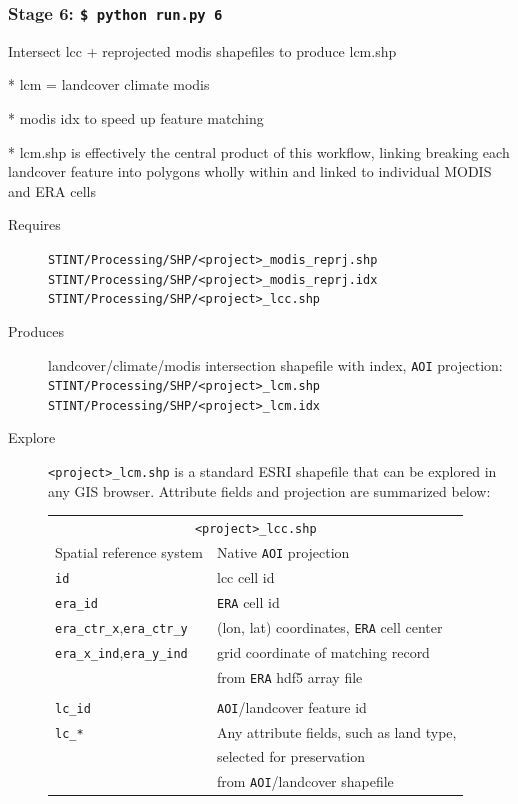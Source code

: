 \documentclass[twoside,a4paper]{refart}
\begin{document}
\subsubsection{\textbf{Stage 6:} \texttt{\$ python run.py 6}}
        Intersect lcc + reprojected modis shapefiles to produce lcm.shp
        
        * lcm = landcover climate modis
        
        * modis idx to speed up feature matching
        
        * lcm.shp is effectively the central product of this workflow, linking
          breaking each landcover feature into polygons wholly within and
          linked to individual MODIS and ERA cells

  \begin{description}
    \item [Requires]
      \texttt{STINT/Processing/SHP/<project>\_modis\_reprj.shp} \\
      \texttt{STINT/Processing/SHP/<project>\_modis\_reprj.idx} \\
      \texttt{STINT/Processing/SHP/<project>\_lcc.shp}
  
  
    \item [Produces]
      landcover/climate/modis intersection shapefile with index, 
      \texttt{AOI} projection:\\
      \texttt{STINT/Processing/SHP/<project>\_lcm.shp}\\
      \texttt{STINT/Processing/SHP/<project>\_lcm.idx}
      

    \item [Explore]
      \texttt{<project>\_lcm.shp} is a standard ESRI shapefile that can be explored in any GIS browser.  Attribute fields and projection are summarized below:
      
\begin{tabular}{ll}
       \multicolumn{2}{c}{\texttt{<project>\_lcc.shp}} \\
Spatial reference system        & Native \texttt{AOI} projection \\
\texttt{id}                     & lcc cell id \\  
\texttt{era\_id}                & \texttt{ERA} cell id \\  
\texttt{era\_ctr\_x},\texttt{era\_ctr\_y} & (lon, lat) coordinates, \texttt{ERA} cell center \\
\texttt{era\_x\_ind},\texttt{era\_y\_ind} & grid coordinate of matching record \\
                                          & from \texttt{ERA} hdf5 array file\\
\\
\texttt{lc\_id}                & \texttt{AOI}/landcover feature id \\
\texttt{lc\_*}                & Any attribute fields, such as land type, \\
                             & selected for preservation \\
                             & from \texttt{AOI}/landcover shapefile \\
\end{tabular}
  \end{description}
\end{document}
